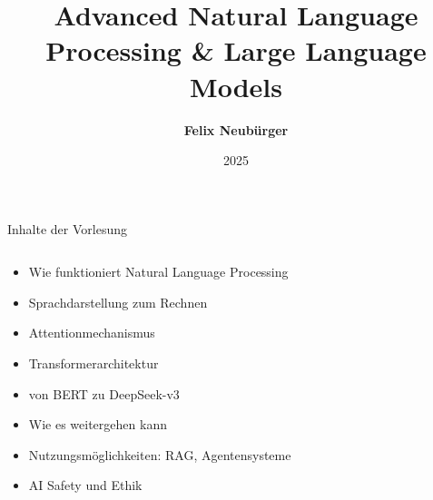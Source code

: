 \documentclass[aspectratio=1610, xcolor=dvipsnames, 9pt]{beamer}
\title{Advanced Natural Language Processing \& Large Language Models}
\author[F.~Neubürger]{ \textbf{Felix Neubürger}}
\institute[I \& W]{Fachhochschule Südwestfalen, Ingenieurs- \& Wirtschaftswissenschaften}
\date{2025}
\begin{document}
\maketitle

\begin{frame}{Inhalte der Vorlesung}
  \begin{columns}
    \begin{column}{1\textwidth}
      \begin{itemize}
        \item Wie funktioniert Natural Language Processing\newline
        \item Sprachdarstellung zum Rechnen \newline
        \item Attentionmechanismus \newline
        \item Transformerarchitektur  \newline
        \item von BERT zu DeepSeek-v3 \newline 
        \item Wie es weitergehen kann \newline
        \item Nutzungsmöglichkeiten: RAG, Agentensysteme \newline
        \item AI Safety und Ethik
      \end{itemize}
    \end{column}
    \begin{column}{0\textwidth}
    \end{column}
  \end{columns}
\end{frame}
\end{document}

